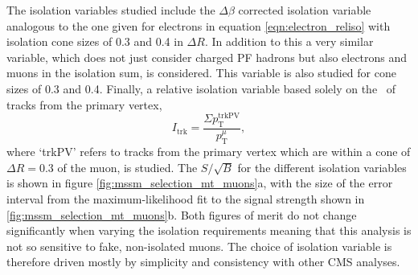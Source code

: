 The isolation variables studied include
the $\Delta\beta$ corrected isolation variable analogous
to the one given for electrons in equation \ref{eqn:electron_reliso} with 
isolation cone sizes of 0.3 and 0.4 in $\Delta R$. In addition
to this a very similar
variable, which does not just consider charged \ac{PF} hadrons but
also electrons and muons in the isolation sum, is considered. This
variable is also studied for cone sizes of 0.3 and 0.4. Finally,
a relative isolation variable based solely on the \pT~of tracks from the primary
vertex,
\begin{equation}\label{eqn:reltrkiso}
I_{\text{trk}} = \frac{\Sigma p_{\text{T}}^{\text{trkPV}}}{p_{\text{T}}^{\mu}}, \end{equation} 
where `trkPV' refers to tracks from the primary vertex which are within a cone of $\Delta R=0.3$ of the muon,
is studied. The $S/\sqrt{B}$ for the different isolation variables is shown in figure \ref{fig:mssm_selection_mt_muons}a, with the
size of the error interval from the maximum-likelihood fit to the \Ztautau signal strength shown in 
\ref{fig:mssm_selection_mt_muons}b. Both figures of merit do not
change significantly when varying the isolation requirements meaning that this analysis
is not so sensitive to fake, non-isolated muons. The choice of isolation variable is therefore
driven mostly by simplicity and consistency with other \ac{CMS} analyses.

